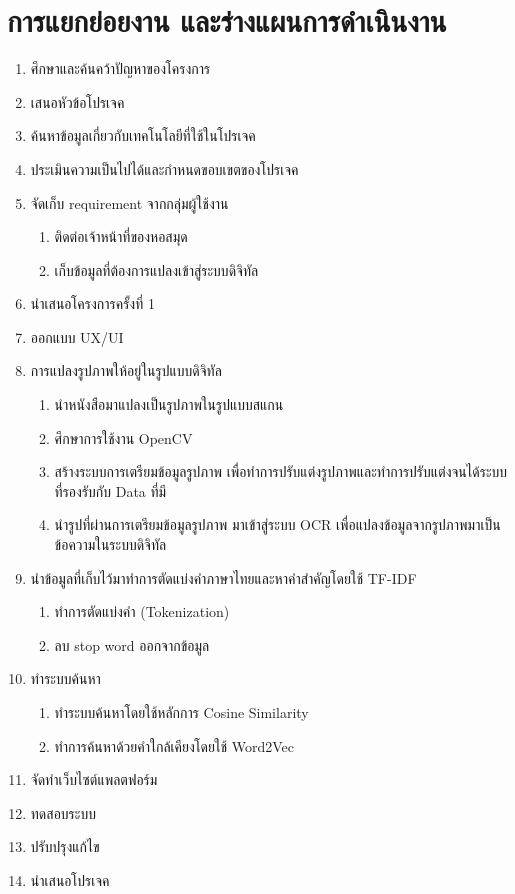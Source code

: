 \section{การแยกย่อยงาน และร่างแผนการดำเนินงาน}
\begin{enumerate}
    \item 	ศึกษาและค้นคว้าปัญหาของโครงการ
    \item 	เสนอหัวข้อโปรเจค 
    \item 	ค้นหาข้อมูลเกี่ยวกับเทคโนโลยีที่ใช้ในโปรเจค
    \item 	ประเมินความเป็นไปได้และกำหนดขอบเขตของโปรเจค 
    \item 	จัดเก็บ requirement จากกลุ่มผู้ใช้งาน
    \begin{enumerate}[label*=\arabic*.]
        \item   ติดต่อเจ้าหน้าที่ของหอสมุด
        \item   เก็บข้อมูลที่ต้องการแปลงเข้าสู่ระบบดิจิทัล
    \end{enumerate}
    \item 	นำเสนอโครงการครั้งที่ 1 
    \item 	ออกแบบ UX/UI
    \item 	การแปลงรูปภาพให้อยู่ในรูปแบบดิจิทัล
    \begin{enumerate}[label*=\arabic*.]
        \item  นำหนังสือมาแปลงเป็นรูปภาพในรูปแบบสแกน 
        \item  ศึกษาการใช้งาน OpenCV
        \item  สร้างระบบการเตรียมข้อมูลรูปภาพ เพื่อทำการปรับแต่งรูปภาพและทำการปรับแต่งจนได้ระบบที่รองรับกับ Data ที่มี
        \item  นำรูปที่ผ่านการเตรียมข้อมูลรูปภาพ มาเข้าสู่ระบบ OCR เพื่อแปลงข้อมูลจากรูปภาพมาเป็นข้อความในระบบดิจิทัล 
    \end{enumerate}
    \item 	นำข้อมูลที่เก็บไว้มาทำการตัดแบ่งคำภาษาไทยและหาคำสำคัญโดยใช้ TF-IDF 
    \begin{enumerate}[label*=\arabic*.]
        \item	ทำการตัดแบ่งคำ (Tokenization)
        \item	ลบ stop word ออกจากข้อมูล 
    \end{enumerate}
    \item	ทำระบบค้นหา 
    \begin{enumerate}[label*=\arabic*.]
       \item	ทำระบบค้นหาโดยใช้หลักการ Cosine Similarity
       \item	ทำการค้นหาด้วยคำใกล้เคียงโดยใช้ Word2Vec 
    \end{enumerate}    
    \item   จัดทำเว็บไซต์แพลตฟอร์ม
    \item   ทดสอบระบบ
    \item   ปรับปรุงแก้ไข
    \item   นำเสนอโปรเจค
    \end{enumerate}

